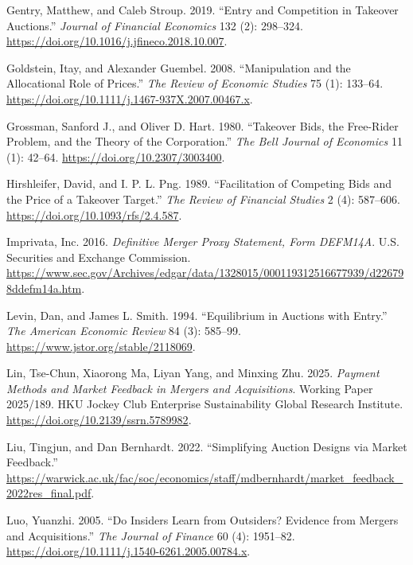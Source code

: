 \documentclass[
  12pt,
]{article}
\newlength{\cslhangindent}
\newenvironment{CSLReferences}[2] %
 {\begin{list}{}{%
  \setlength{\itemindent}{0pt}
  \setlength{\leftmargin}{0pt}
  \setlength{\parsep}{0pt}
  \ifodd #1
   \setlength{\leftmargin}{\cslhangindent}
   \setlength{\itemindent}{-1\cslhangindent}
  \fi
  \setlength{\itemsep}{#2\baselineskip}}}
 {\end{list}}
\begin{document}
\begin{CSLReferences}{1}{1}
Gentry, Matthew, and Caleb Stroup. 2019. {``Entry and Competition in
Takeover Auctions.''} \emph{Journal of Financial Economics} 132 (2):
298--324. \url{https://doi.org/10.1016/j.jfineco.2018.10.007}.

Goldstein, Itay, and Alexander Guembel. 2008. {``Manipulation and the
Allocational Role of Prices.''} \emph{The Review of Economic Studies} 75
(1): 133--64. \url{https://doi.org/10.1111/j.1467-937X.2007.00467.x}.

Grossman, Sanford J., and Oliver D. Hart. 1980. {``Takeover Bids, the
Free-Rider Problem, and the Theory of the Corporation.''} \emph{The Bell
Journal of Economics} 11 (1): 42--64.
\url{https://doi.org/10.2307/3003400}.

Hirshleifer, David, and I. P. L. Png. 1989. {``Facilitation of Competing
Bids and the Price of a Takeover Target.''} \emph{The Review of
Financial Studies} 2 (4): 587--606.
\url{https://doi.org/10.1093/rfs/2.4.587}.

Imprivata, Inc. 2016. \emph{Definitive Merger Proxy Statement, Form
{DEFM14A}}. U.S. Securities and Exchange Commission.
\url{https://www.sec.gov/Archives/edgar/data/1328015/000119312516677939/d226798ddefm14a.htm}.

Levin, Dan, and James L. Smith. 1994. {``Equilibrium in Auctions with
Entry.''} \emph{The American Economic Review} 84 (3): 585--99.
\url{https://www.jstor.org/stable/2118069}.

Lin, Tse-Chun, Xiaorong Ma, Liyan Yang, and Minxing Zhu. 2025.
\emph{Payment Methods and Market Feedback in Mergers and Acquisitions}.
Working Paper 2025/189. HKU Jockey Club Enterprise Sustainability Global
Research Institute. \url{https://doi.org/10.2139/ssrn.5789982}.

Liu, Tingjun, and Dan Bernhardt. 2022. {``Simplifying Auction Designs
via Market Feedback.''}
\url{https://warwick.ac.uk/fac/soc/economics/staff/mdbernhardt/market_feedback_2022res_final.pdf}.

Luo, Yuanzhi. 2005. {``Do Insiders Learn from Outsiders? Evidence from
Mergers and Acquisitions.''} \emph{The Journal of Finance} 60 (4):
1951--82. \url{https://doi.org/10.1111/j.1540-6261.2005.00784.x}.


\end{CSLReferences}
\end{document}
